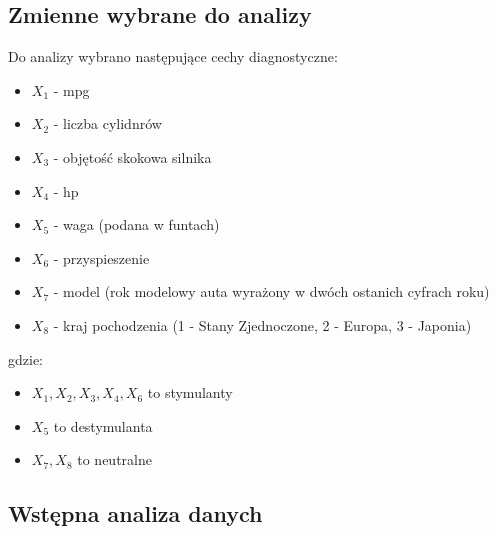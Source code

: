 \documentclass{article}
\begin{document}
    \subsection{Zmienne wybrane do analizy}
    Do analizy wybrano następujące cechy diagnostyczne:
    \begin{itemize}
        \item ${X_1}$ - mpg
        \item ${X_2}$ - liczba cylidnrów 
        \item ${X_3}$ - objętość skokowa silnika
        \item ${X_4}$ - hp
        \item ${X_5}$ - waga (podana w funtach)
        \item ${X_6}$ - przyspieszenie
        \item ${X_7}$ - model (rok modelowy auta wyrażony w dwóch ostanich cyfrach roku)
        \item ${X_8}$ - kraj pochodzenia (1 - Stany Zjednoczone, 2 - Europa, 3 - Japonia)
    \end{itemize}
    gdzie:
    \begin{itemize}
        \item ${X_1, X_2, X_3, X_4, X_6}$ to stymulanty
        \item ${X_5}$ to destymulanta
        \item ${X_7, X_8}$ to neutralne
    \end{itemize}
    
    
    \subsection{Wstępna analiza danych}
\end{document}
